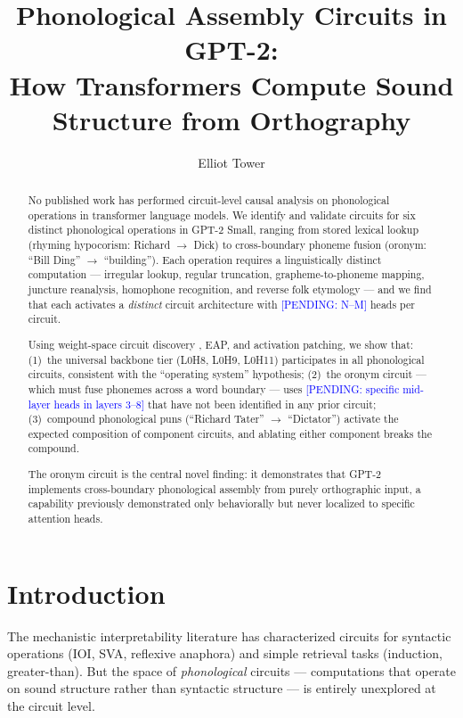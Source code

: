 \documentclass[11pt,a4paper]{article}
\title{\textbf{Phonological Assembly Circuits in GPT-2:\\
How Transformers Compute Sound Structure from Orthography}}
\author{
  Elliot Tower \\
}
\newcommand{\PENDING}[1]{\textcolor{blue}{[PENDING: #1]}}
\begin{document}
\maketitle

\begin{abstract}
No published work has performed circuit-level causal analysis on phonological
operations in transformer language models. We identify and validate circuits for
six distinct phonological operations in GPT-2 Small, ranging from stored lexical
lookup (rhyming hypocorism: Richard $\to$ Dick) to cross-boundary phoneme fusion
(oronym: ``Bill Ding'' $\to$ ``building''). Each operation requires a
linguistically distinct computation --- irregular lookup, regular truncation,
grapheme-to-phoneme mapping, juncture reanalysis, homophone recognition, and
reverse folk etymology --- and we find that each activates a \emph{distinct}
circuit architecture with \PENDING{N--M} heads per circuit.

Using weight-space circuit discovery \citep{tower2026weights}, EAP, and
activation patching, we show that: (1)~the universal backbone tier (L0H8, L0H9,
L0H11) participates in all phonological circuits, consistent with the
``operating system'' hypothesis; (2)~the oronym circuit --- which must fuse
phonemes across a word boundary --- uses \PENDING{specific mid-layer heads
in layers 3--8} that have not been identified in any prior circuit;
(3)~compound phonological puns (``Richard Tater'' $\to$ ``Dictator'') activate
the expected composition of component circuits, and ablating either component
breaks the compound.

The oronym circuit is the central novel finding: it demonstrates that GPT-2
implements cross-boundary phonological assembly from purely orthographic input,
a capability previously demonstrated only behaviorally
\citep{liao2026tokenization,suvarna2024phonologybench} but never localized to
specific attention heads.
\end{abstract}

\section{Introduction}

The mechanistic interpretability literature has characterized circuits for
syntactic operations (IOI, SVA, reflexive anaphora) and simple retrieval tasks
(induction, greater-than). But the space of \emph{phonological} circuits ---
computations that operate on sound structure rather than syntactic structure ---
is entirely unexplored at the circuit level.
\end{document}
